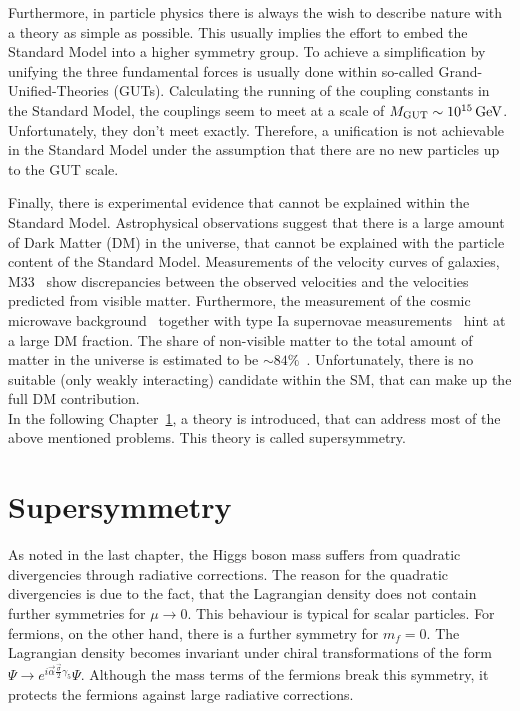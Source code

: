 Furthermore, in particle physics there is always the wish to describe nature with a theory as simple as possible.
This usually implies the effort to embed the Standard Model into a higher symmetry group.
To achieve a simplification by unifying the three fundamental forces is usually done within so-called Grand-Unified-Theories (GUTs).
Calculating the running of the coupling constants in the Standard Model, the couplings seem to meet at a scale of $M_{\text{GUT}} \sim 10^{15}\,\text{Ge}\kern-0.06667em\text{V}$.
Unfortunately, they don't meet exactly.
Therefore, a unification is not achievable in the Standard Model under the assumption that there are no new particles up to the GUT scale.


Finally, there is experimental evidence that cannot be explained within the Standard Model.
Astrophysical observations suggest that there is a large amount of Dark Matter (DM) in the universe, that cannot be explained with the particle content of the Standard Model.
Measurements of the velocity curves of galaxies, \eg M33~\cite{bib:DM:RotationCurves} show discrepancies between the observed velocities and the velocities predicted from visible matter.
Furthermore, the measurement of the cosmic microwave background~\cite{bib:Planck_2015} together with type Ia supernovae measurements~\cite{bib:Supernovae} hint at a large DM fraction.
The share of non-visible matter to the total amount of matter in the universe is estimated to be $\sim84\%$~\cite{bib:Planck_2015}.
Unfortunately, there is no suitable (only weakly interacting) candidate within the SM, that can make up the full DM contribution.\\

In the following Chapter~\ref{ch:Supersymmetry}, a theory is introduced, that can address most of the above mentioned problems.
This theory is called supersymmetry.


\chapter{Supersymmetry}
\label{ch:Supersymmetry}

As noted in the last chapter, the Higgs boson mass suffers from quadratic divergencies through radiative corrections.
The reason for the quadratic divergencies is due to the fact, that the Lagrangian density does not contain further symmetries for $\mu\rightarrow 0 $.
This behaviour is typical for scalar particles.
For fermions, on the other hand, there is a further symmetry for $m_f=0$. 
The Lagrangian density becomes invariant under chiral transformations of the form $\Psi \rightarrow e^{i\vec{\alpha}\frac{\vec{\sigma}}{2} \gamma_5} \Psi$.
Although the mass terms of the fermions break this symmetry, it protects the fermions against large radiative corrections.

